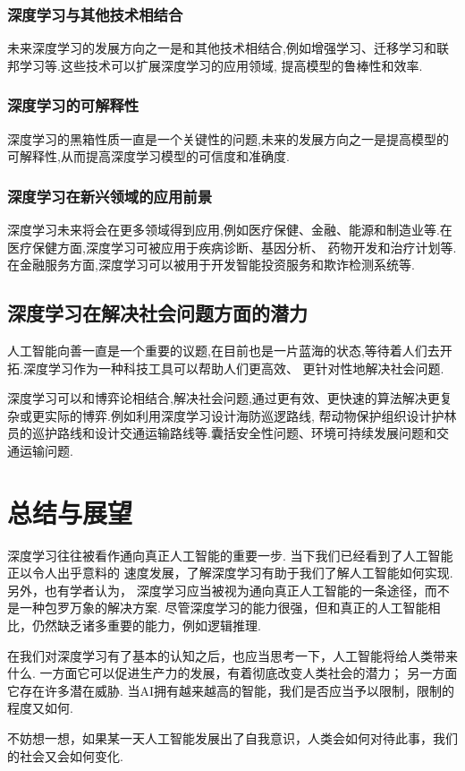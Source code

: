 \documentclass[UTF8]{ctexbook}
\begin{document}
\subsection{深度学习与其他技术相结合}
未来深度学习的发展方向之一是和其他技术相结合,例如增强学习、迁移学习和联邦学习等.这些技术可以扩展深度学习的应用领域,
提高模型的鲁棒性和效率.
\subsection{深度学习的可解释性}
深度学习的黑箱性质一直是一个关键性的问题,未来的发展方向之一是提高模型的可解释性,从而提高深度学习模型的可信度和准确度.
\subsection{深度学习在新兴领域的应用前景}
深度学习未来将会在更多领域得到应用,例如医疗保健、金融、能源和制造业等.在医疗保健方面,深度学习可被应用于疾病诊断、基因分析、
药物开发和治疗计划等.在金融服务方面,深度学习可以被用于开发智能投资服务和欺诈检测系统等.
\section{深度学习在解决社会问题方面的潜力}
人工智能向善一直是一个重要的议题,在目前也是一片蓝海的状态,等待着人们去开拓.深度学习作为一种科技工具可以帮助人们更高效、
更针对性地解决社会问题.

深度学习可以和博弈论相结合,解决社会问题,通过更有效、更快速的算法解决更复杂或更实际的博弈.例如利用深度学习设计海防巡逻路线,
帮动物保护组织设计护林员的巡护路线和设计交通运输路线等.囊括安全性问题、环境可持续发展问题和交通运输问题.
\let\cleardoublepage\clearpage
\chapter{总结与展望}
深度学习往往被看作通向真正人工智能的重要一步. 当下我们已经看到了人工智能正以令人出乎意料的
速度发展，了解深度学习有助于我们了解人工智能如何实现. 另外，也有学者认为，
深度学习应当被视为通向真正人工智能的一条途径，而不是一种包罗万象的解决方案.
尽管深度学习的能力很强，但和真正的人工智能相比，仍然缺乏诸多重要的能力，例如逻辑推理.

在我们对深度学习有了基本的认知之后，也应当思考一下，人工智能将给人类带来什么.
一方面它可以促进生产力的发展，有着彻底改变人类社会的潜力；
另一方面它存在许多潜在威胁. 当AI拥有越来越高的智能，我们是否应当予以限制，限制的程度又如何. 

不妨想一想，如果某一天人工智能发展出了自我意识，人类会如何对待此事，我们的社会又会如何变化.



\end{document}
